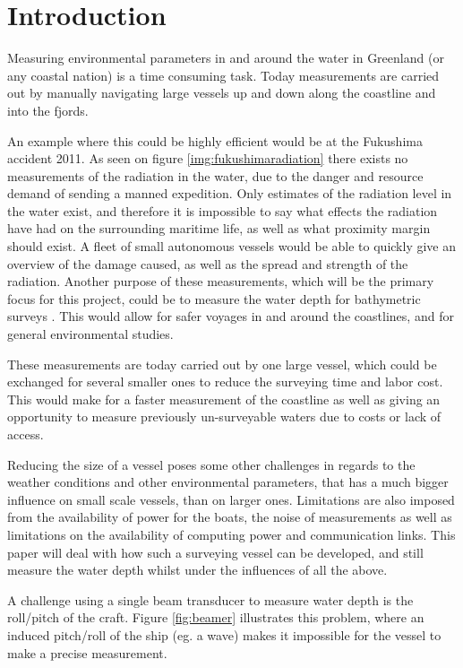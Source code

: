 \chapter{Introduction}
Measuring environmental parameters in and around the water in Greenland (or any coastal nation) is a time consuming task. Today measurements are carried out by manually navigating large vessels up and down along the coastline and into the fjords. 

An example where this could be highly efficient would be at the Fukushima accident 2011. As seen on figure \ref{img:fukushimaradiation} there exists no measurements of the radiation in the water, due to the danger and resource demand of sending a manned expedition. Only estimates of the radiation level in the water exist, and therefore it is impossible to say what effects the radiation have had on the surrounding maritime life, as well as what proximity margin should exist. A fleet of small autonomous vessels would be able to quickly give an overview of the damage caused, as well as the spread and strength of the radiation.
Another purpose of these measurements, which will be the primary focus for this project, could be to measure the water depth for bathymetric surveys \cite{StweartOceanography}. This would allow for safer voyages in and around the coastlines, and for general environmental studies. 

These measurements are today carried out by one large vessel, which could be exchanged for several smaller ones to reduce the surveying time and labor cost. This would make for a faster measurement of the coastline as well as giving an opportunity to measure previously un-surveyable waters due to costs or lack of access. 

Reducing the size of a vessel poses some other challenges in regards to the weather conditions and other environmental parameters, that has a much bigger influence on small scale vessels, than on larger ones.
Limitations are also imposed from the availability of power for the boats,  the noise of measurements as well as limitations on the availability of computing power and communication links. This paper will deal with how such a surveying vessel can be developed, and still measure the water depth whilst under the influences of all the above.

A challenge using a single beam transducer to measure water depth is the roll/pitch of the craft. Figure \vref{fig:beamer} illustrates this problem, where an induced pitch/roll of the ship (eg. a wave) makes it impossible for the vessel to make a precise measurement.

